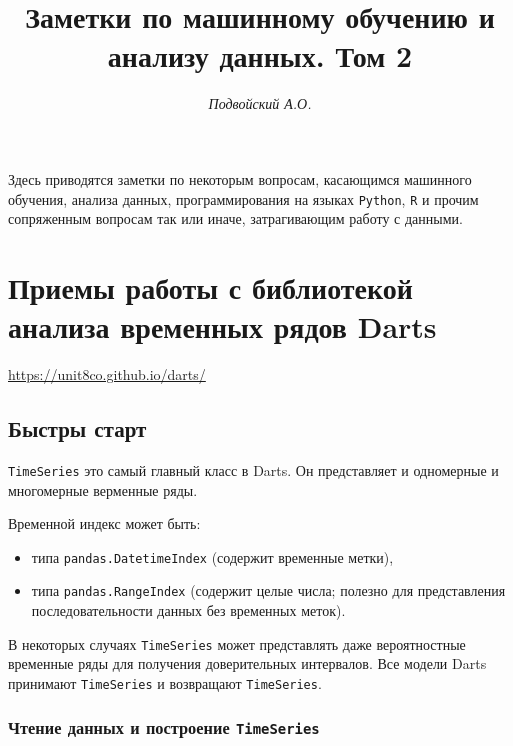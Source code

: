 \documentclass[%
	11pt,
	a4paper,
	utf8,
		]{article}
\begin{document}
\title{Заметки по машинному обучению и анализу данных. Том 2}

\author{\itshape Подвойский А.О.}

\date{}
\maketitle

\thispagestyle{fancy}

Здесь приводятся заметки по некоторым вопросам, касающимся машинного обучения, анализа данных, программирования на языках \texttt{Python}, \texttt{R} и прочим сопряженным вопросам так или иначе, затрагивающим работу с данными.



\tableofcontents

\section{Приемы работы с библиотекой анализа временных рядов Darts}

\url{https://unit8co.github.io/darts/}

\subsection{Быстры старт}

\verb|TimeSeries| это самый главный класс в Darts. Он представляет и одномерные и многомерные верменные ряды.

Временной индекс может быть:
\begin{itemize}
	\item типа \verb|pandas.DatetimeIndex| (содержит временные метки),
	
	\item типа \verb|pandas.RangeIndex| (содержит целые числа; полезно для представления последовательности данных без временных меток).
\end{itemize}

В некоторых случаях \verb|TimeSeries| может представлять даже вероятностные временные ряды для получения доверительных интервалов. Все модели Darts принимают \verb|TimeSeries| и возвращают \verb|TimeSeries|.

\subsubsection{Чтение данных и построение \texttt{TimeSeries}}
\end{document}
